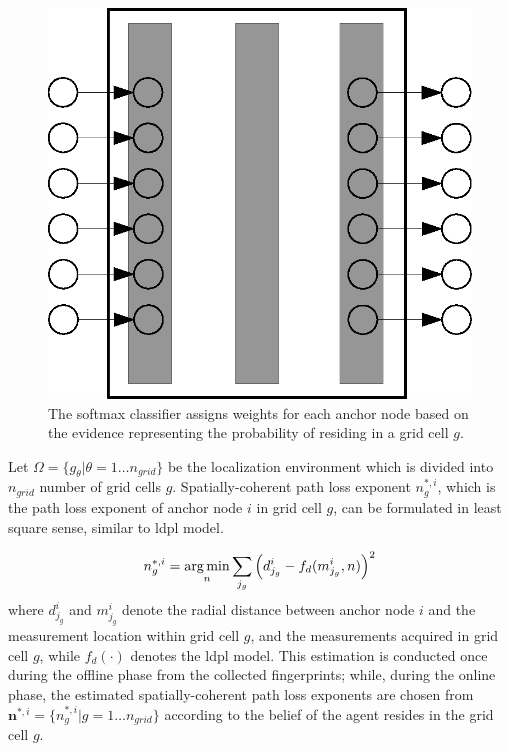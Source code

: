     \begin{figure}[thpb]
       \centering
       \includegraphics[width=\linewidth]{figures/softmax.eps}
       \caption{\label{fig:softmax}The softmax classifier assigns weights for each anchor node based on the evidence representing the probability of residing in a grid cell $g$.}
    \end{figure}

    Let $\Omega=\{g_\theta | \theta=1\ldots n_{grid}\}$ be the localization environment which is divided into $n_{grid}$ number of grid cells $g$.
    Spatially-coherent path loss exponent $n^{*,i}_g$, which is the path loss exponent of anchor node $i$ in grid cell $g$, can be formulated in least square sense, similar to \gls{ldpl} model.

    \begin{equation}
       n^{*,i}_g = \operatorname*{arg\,min}_n{\sum_{j_g} \left({d^i_{j_g} - f_d(m^i_{j_g},n)}\right)^2}
    \end{equation}
    where $d^i_{j_g}$ and $m^i_{j_g}$ denote the radial distance between anchor node $i$ and the measurement location within grid cell $g$, and the measurements acquired in grid cell $g$, while $f_d(\cdot)$ denotes the \gls{ldpl} model.
    This estimation is conducted once during the offline phase from the collected fingerprints; while, during the online phase, the estimated spatially-coherent path loss exponents are chosen from $\bm{n}^{*,i} =\{n^{*,i}_g | g=1\ldots n_{grid}\}$ according to the belief of the agent resides in the grid cell $g$.

